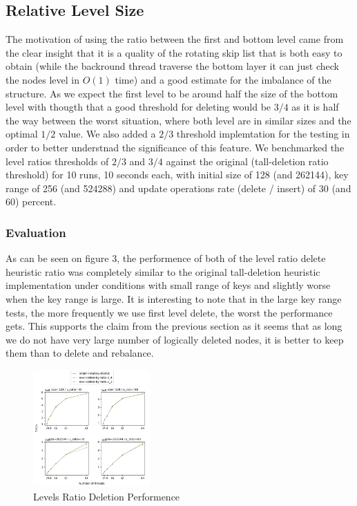 \documentclass{article}
\begin{document}
\subsection{Relative Level Size}
\label{ssec:rls}

The motivation of using the ratio between the first and bottom level came from the clear insight that it is a quality of the rotating skip list that is both easy to obtain (while the backround thread traverse the bottom layer it can just check the nodes level in $O(1)$ time) and a good estimate for the imbalance of the structure. As we expect the first level to be around half the size of the bottom level with thougth that a good threshold for deleting would be $3/4$ as it is half the way between the worst situation, where both level are in similar sizes and the optimal $1/2$ value. We also added a $2/3$ threshold implemtation for the testing in order to better understnad the significance of this feature. We benchmarked the level ratios thresholds of $2/3$ and $3/4$ against the original (tall-deletion ratio threshold) for 10 runs, 10 seconds each, with initial size of 128 (and 262144), key range of 256 (and 524288) and update operations rate (delete / insert) of 30 (and 60) percent.

\subsubsection{Evaluation}
\label{sssec:rls-evl}

As can be seen on figure 3, the performence of both of the level ratio delete heuristic ratio was completely similar to the original tall-deletion heuristic implementation under conditions with small range of keys and slightly worse when the key range is large. It is interesting to note that in the large key range tests, the more frequently we use first level delete, the worst the performance gets. This supports the claim from the previous section as it seems that as long we do not have very large number of logically deleted nodes, it is better to keep them than to delete and rebalance.

\begin{figure}
	\caption{Levels Ratio Deletion Performence}
	\centering
	\includegraphics[width=0.4\textwidth]{level-delete-by-ratio_plot}
\end{figure}
\end{document}
